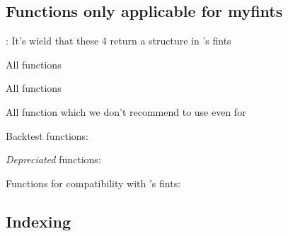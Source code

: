 \subsection{Functions only applicable for myfints}
\begin{itemize*}
\item  {}
\item  {}: It's wield that these 4 return a structure in \matlab's fints
\item  All  functions
\item  All  functions
\item  {}
\item  All  function which we don't recommend to use even for 
\item  Backtest functions:  
\item  \emph{Depreciated} functions: 
\item  Functions for compatibility with \matlab{}'s fints: 
\end{itemize*}

\subsection{Indexing}

